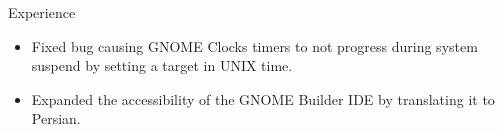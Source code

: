\documentclass{resume} %
\begin{document}
\begin{workSection}{Experience}
	
	\experienceItem[
	company=Texas Instruments,
	location=Dallas{,} TX,
	position=Upcoming Information Technology Intern,
	duration=Summer 2024,
	]
	
	\experienceItem[
	company=GNOME Foundation,
	location=Remote,
	position=Open-Source Contributor,
	duration=December 2023 {-} present
	]
	\begin{itemize}
		\vspace{-0.5em}
		\itemsep -6pt {}
		\item Fixed bug causing GNOME Clocks timers to not progress during system suspend by setting a target in UNIX time.
		\item Expanded the accessibility of the GNOME Builder IDE by translating it to Persian.
	\end{itemize}


\end{workSection}
\end{document}
